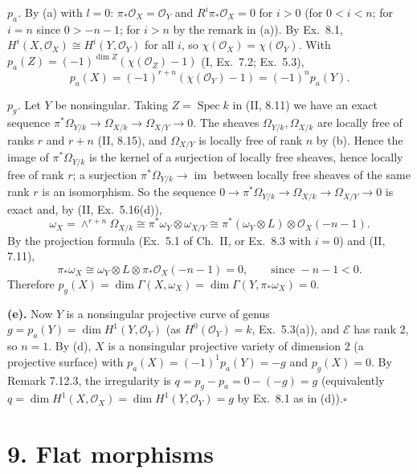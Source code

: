 \documentclass[11pt]{article}
\begin{document}
\emph{$p_a$.} By (a) with $l=0$: $\pi_*\mathcal O_X=\mathcal O_Y$ and $R^i\pi_*\mathcal O_X=0$ for $i>0$ (for $0<i<n$; for $i=n$ since $0>-n-1$; for $i>n$ by the remark in (a)). By Ex.~8.1, $H^i(X,\mathcal O_X)\cong H^i(Y,\mathcal O_Y)$ for all $i$, so $\chi(\mathcal O_X)=\chi(\mathcal O_Y)$. With $p_a(Z)=(-1)^{\dim Z}(\chi(\mathcal O_Z)-1)$ (I, Ex.~7.2; Ex.~5.3),
\[
p_a(X)=(-1)^{r+n}(\chi(\mathcal O_Y)-1)=(-1)^np_a(Y).
\]

\emph{$p_g$.} Let $Y$ be nonsingular. Taking $Z=\operatorname{Spec}k$ in (II, 8.11) we have an exact sequence $\pi^*\Omega_{Y/k}\to\Omega_{X/k}\to\Omega_{X/Y}\to0$. The sheaves $\Omega_{Y/k},\Omega_{X/k}$ are locally free of ranks $r$ and $r+n$ (II, 8.15), and $\Omega_{X/Y}$ is locally free of rank $n$ by (b). Hence the image of $\pi^*\Omega_{Y/k}$ is the kernel of a surjection of locally free sheaves, hence locally free of rank $r$; a surjection $\pi^*\Omega_{Y/k}\to\operatorname{im}$ between locally free sheaves of the same rank $r$ is an isomorphism. So the sequence $0\to\pi^*\Omega_{Y/k}\to\Omega_{X/k}\to\Omega_{X/Y}\to0$ is exact and, by (II, Ex.~5.16(d)),
\[
\omega_X=\wedge^{r+n}\Omega_{X/k}\cong\pi^*\omega_Y\otimes\omega_{X/Y}\cong\pi^*(\omega_Y\otimes L)\otimes\mathcal O_X(-n-1).
\]
By the projection formula (Ex.~5.1 of Ch.~II, or Ex.~8.3 with $i=0$) and (II, 7.11),
\[
\pi_*\omega_X\cong\omega_Y\otimes L\otimes\pi_*\mathcal O_X(-n-1)=0,\qquad\text{since }-n-1<0 .
\]
Therefore $p_g(X)=\dim\Gamma(X,\omega_X)=\dim\Gamma(Y,\pi_*\omega_X)=0$.

\textbf{(e).} Now $Y$ is a nonsingular projective curve of genus $g=p_a(Y)=\dim H^1(Y,\mathcal O_Y)$ (as $H^0(\mathcal O_Y)=k$, Ex.~5.3(a)), and $\mathcal E$ has rank $2$, so $n=1$. By (d), $X$ is a nonsingular projective variety of dimension $2$ (a projective surface) with $p_a(X)=(-1)^1p_a(Y)=-g$ and $p_g(X)=0$. By Remark 7.12.3, the irregularity is $q=p_g-p_a=0-(-g)=g$ (equivalently $q=\dim H^1(X,\mathcal O_X)=\dim H^1(Y,\mathcal O_Y)=g$ by Ex.~8.1 as in (d)).\hfill$\square$

\section*{9. Flat morphisms}
\end{document}
